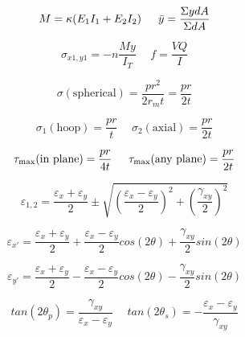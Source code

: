 \documentclass[twocolumn, 12pt]{article}
\begin{document}
{\begin{equation*}
    M=\kappa (E_1I_1+E_2I_2) \hspace{15pt} \Bar{y} = \frac{\Sigma ydA }{\Sigma dA}
\end{equation*}

\begin{equation*}
    \sigma_{x1,y1}=-n\frac{My}{I_T}  \hspace{15pt}f=\frac{VQ}{I}  
\end{equation*}

\begin{equation*}
    \sigma(\text{spherical})=\frac{pr^2}{2r_mt}=\frac{pr}{2t}
\end{equation*}

\begin{equation*}
    \sigma_1(\text{hoop})=\frac{pr}{t} \hspace{15pt} \sigma_2(\text{axial})=\frac{pr}{2t}
\end{equation*}

\begin{equation*}
    \tau_{\text{max}}(\text{in plane})=\frac{pr}{4t} \hspace{15pt} \tau_{\text{\text{max}}}(\text{any plane})=\frac{pr}{2t}
\end{equation*}

\begin{equation*}
    \varepsilon_{1,2} = \frac{\varepsilon_x +\varepsilon_y}{2} \pm \sqrt{ \left(\frac{\varepsilon_x - \varepsilon_y}{2}\right)^2  + \left(\frac{\gamma_{xy}}{2}\right)^2   }
\end{equation*}

\begin{equation*}
    \varepsilon_{x'} = \frac{\varepsilon_x + \varepsilon_y }{2} + \frac{\varepsilon_x -\varepsilon_y}{2}cos(2\theta) + \frac{\gamma_{xy}}{2} sin(2\theta)
\end{equation*}

\begin{equation*}
    \varepsilon_{y'} = \frac{\varepsilon_x + \varepsilon_y }{2} - \frac{\varepsilon_x -\varepsilon_y}{2}cos(2\theta) - \frac{\gamma_{xy}}{2} sin(2\theta)
\end{equation*}

\begin{equation*}
    tan(2\theta_p) = \frac{\gamma_{xy}}{\varepsilon_x - \varepsilon_y} \hspace{15pt} tan(2\theta_s) = -\frac{\varepsilon_x - \varepsilon_y}{\gamma_{xy}}
\end{equation*}

}
\end{document}
